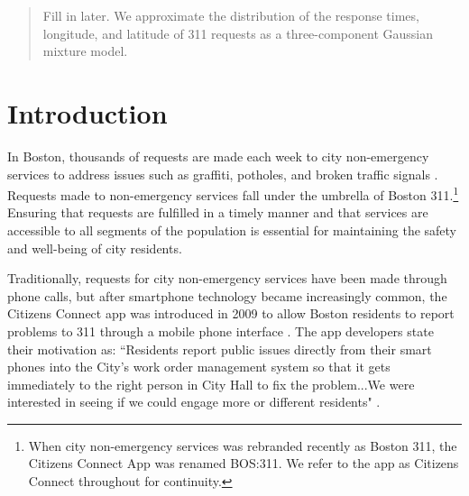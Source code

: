 \documentclass[twoside]{article}
\theoremstyle{theorem}
\theoremstyle{theorem}
\theoremstyle{theorem}
\theoremstyle{lemma}
\theoremstyle{definition}
\theoremstyle{example}
\begin{document}

\makeatletter
\def\BState{\State\hskip-\ALG@thistlm}
\makeatother
%

%


\begin{abstract}
Fill in later.
We approximate the distribution of the response times, longitude, and latitude of 311 requests as a three-component Gaussian mixture model. 
\end{abstract}

\section{Introduction}

In Boston, thousands of requests are made each week to city non-emergency services to address issues such as graffiti, potholes, and broken traffic signals \cite{walshpressrelease}. Requests made to non-emergency services fall under the umbrella of Boston 311.\footnote{When city non-emergency services was rebranded recently as Boston 311, the Citizens Connect App was renamed BOS:311. We refer to the app as Citizens Connect throughout for continuity.} Ensuring that requests are fulfilled in a timely manner and that services are accessible to all segments of the population is essential for maintaining the safety and well-being of city residents. 

Traditionally, requests for city non-emergency services have been made through phone calls, but after smartphone technology became increasingly common, the Citizens Connect app was introduced in 2009 to allow Boston residents to report problems to 311 through a mobile phone interface \cite{newurbanmechanics}. The app developers state their motivation as: ``Residents report public issues directly from their smart phones into the City's work order management system so that it gets immediately to the right person in City Hall to fix the problem...We were interested in seeing if we could engage more or different residents" \cite{newurbanmechanics}.  
\end{document}
